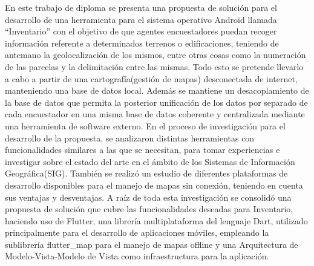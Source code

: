 \begin{resumen}

	En este trabajo de diploma se presenta una propuesta de solución para el desarrollo
	de una herramienta para el sistema operativo Android llamada “Inventario” con el
	objetivo de que agentes encuestadores puedan recoger información referente a
	determinados terrenos o edificaciones, teniendo de antemano la geolocalización de
	los mismos, entre otras cosas como la numeración de las parcelas y la delimitación
	entre las mismas. Todo esto se pretende llevarlo a cabo a partir de una
	cartografía(gestión de mapas) desconectada de internet, manteniendo una base de
	datos local. Además se mantiene un desacoplamiento de la base de datos que
	permita la posterior unificación de los datos por separado de cada encuestador en
	una misma base de datos coherente y centralizada mediante una herramienta de
	software externo. En el proceso de investigación para el desarrollo de la propuesta,
	se analizaron distintas herramientas con funcionalidades similares a las que se
	necesitan, para tomar experiencias e investigar sobre el estado del arte en el ámbito
	de los Sistemas de Información Geográfica(SIG)\cite{SIG}. También se realizó un estudio
	de diferentes plataformas de desarrollo disponibles para el manejo de mapas sin
	conexión, teniendo en cuenta sus ventajas y desventajas. A raíz de toda esta
	investigación se consolidó una propuesta de solución que cubre las funcionalidades
	deseadas para Inventario, haciendo uso de Flutter\cite{flutterOficial}, una librería multiplataforma
	del lenguaje Dart\cite{dartOficial}, utilizado principalmente para el desarrollo de aplicaciones móviles,
	empleando la sublibrería flutter\_map\cite{flutterMap} para el manejo de mapas offline y una Arquitectura de Modelo-Vista-Modelo de Vista\cite{MVVM}
	como infraestructura para la aplicación.


\end{resumen}

